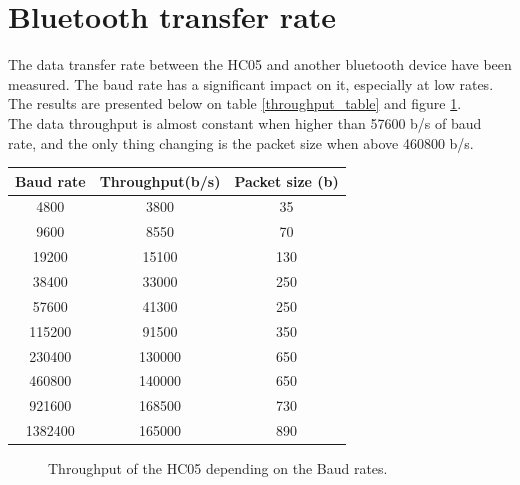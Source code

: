 \documentclass[11pt]{article}
\begin{document}
\section{Bluetooth transfer rate}
The data transfer rate between the HC05 and another bluetooth device have been measured. The baud rate has a significant impact on it, especially at low rates. The results are presented below on table \ref{throughput_table} and figure \ref{throughput_fig}.\\
The data throughput is almost constant when higher than 57600 b/s of baud rate, and the only thing changing is the packet size when above 460800 b/s.
\begin{center}
\label{throughput_table}
\begin{tabular}{|c|c|c|}
\hline
Baud rate & Throughput(b/s) & Packet size (b)\\
\hline
4800 & 3800 & 35 \\
\hline
9600 & 8550 & 70 \\
\hline
19200 & 15100 & 130 \\
\hline
38400 & 33000 & 250 \\
\hline
57600 & 41300 & 250 \\
\hline
115200 & 91500 & 350 \\
\hline
230400 & 130000 & 650 \\
\hline
460800 & 140000 & 650 \\
\hline
921600 & 168500 & 730 \\
\hline
1382400 & 165000 & 890\\
\hline
\end{tabular}
\end{center}
\begin{figure}[H]
\center
{}
\caption{Throughput of the HC05 depending on the Baud rates.}
\label{throughput_fig}
\end{figure}
\end{document}
